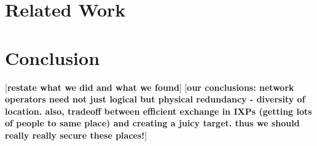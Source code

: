 \documentclass{sig-alternate-10pt}
\newcommand{\tbd}[1]{[{\bf{#1}}]}
\begin{document}
    \section{Related Work}
        \label{sec:related_work}
        

    \section{Conclusion}
        \label{sec:conclusion}    
    \tbd{restate what we did and what we found}
    \tbd{our conclusions: network operators need not just logical but
    physical redundancy - diversity of location. also, tradeoff between
    efficient exchange in IXPs (getting lots of people to same place) and
    creating a juicy target. thus we should really really secure these
    places!}



%
\end{document}

